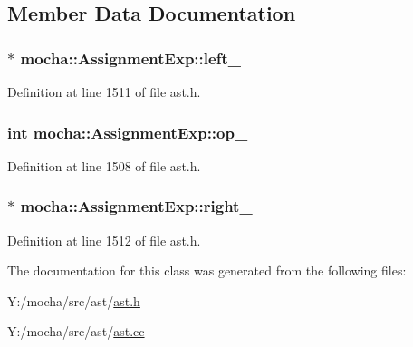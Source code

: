 \subsection{Member Data Documentation}
\hypertarget{classmocha_1_1_assignment_exp_ad899e6df5e3e26572eece7523e1a4327}{
\subsubsection[{left\_\-}]{$\ast$ {\bf mocha::AssignmentExp::left\_\-}}}
\label{classmocha_1_1_assignment_exp_ad899e6df5e3e26572eece7523e1a4327}


Definition at line 1511 of file ast.h.

\hypertarget{classmocha_1_1_assignment_exp_a602624825bd3b7fa70ff1069c0425f9a}{
\subsubsection[{op\_\-}]{\setlength{\rightskip}{0pt plus 5cm}int {\bf mocha::AssignmentExp::op\_\-}}}
\label{classmocha_1_1_assignment_exp_a602624825bd3b7fa70ff1069c0425f9a}


Definition at line 1508 of file ast.h.

\hypertarget{classmocha_1_1_assignment_exp_a41d8c915810d5f81e7ba584402d2e692}{
\subsubsection[{right\_\-}]{$\ast$ {\bf mocha::AssignmentExp::right\_\-}}}
\label{classmocha_1_1_assignment_exp_a41d8c915810d5f81e7ba584402d2e692}


Definition at line 1512 of file ast.h.



The documentation for this class was generated from the following files:\begin{DoxyCompactItemize}
\item 
Y:/mocha/src/ast/\hyperlink{ast_8h}{ast.h}\item 
Y:/mocha/src/ast/\hyperlink{ast_8cc}{ast.cc}\end{DoxyCompactItemize}
